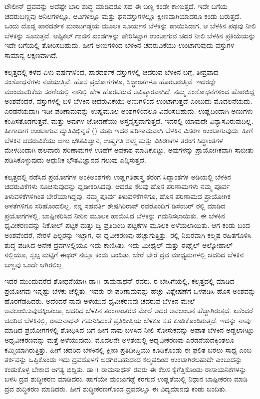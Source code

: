 ಟೌಲೀನ್ ದ್ರವವನ್ನು ಅದೆಷ್ಟೇ ಬಾರಿ ಶುದ್ಧ ಮಾಡಿದರೂ ಸಹ ಈ ಬಣ್ಣ ಕಂಡೇ ಕಾಣುತ್ತದೆ. ಇದೇ ಬಗೆಯ ಚದರುಬಣ್ಣವು ಅನಿಲಗಳಲ್ಲೂ, ಆವಿಗಳಲ್ಲೂ ಮತ್ತು ಘನವಸ್ತುಗಳಲ್ಲೂ ಕ್ಷೀಣವಾಗಿಯಾದರೂ ಕಂಡು ಬರುತ್ತದೆ. ಒಂದು ದೊಡ್ಡ ಪಾರದರ್ಶಕ ಮಂಜುಗಡ್ಡೆಯ ಮೂಲಕ ಸೂರ್ಯನ ಬೆಳಕನ್ನು ಹಾಯಿಸಿದಾಗ, ಆ ಬೆಳಕಿನ ಪಥವು ನೀಲಿ ಬೆಳಕನ್ನು ಸೂಸುತ್ತದೆ. ಆಪ್ಟಿಕಲ್ ಗಾಜಿನ ಖಂಡಗಳನ್ನು ಪೇರಿಸಿಟ್ಟಾಗ ಉಂಟಾಗುವ ಚದರ ನೀಲಿ ಬೆಳಕಿನ ಪ್ರಕಿಯೆಯನ್ನು ಇದೇ ಬಗೆಯಲ್ಲಿ ತೋರಿಸಬಹುದು. ಹೀಗೆ ಅಣುಗಳಿಂದ ಬೆಳಕಿನ ಚದರುವಿಕೆಯು ಉಂಟಾಗುವುದು ವಸ್ತುಗಳ ಸಾಮಾನ್ಯ ಲಕ್ಷಣವಾಗಿದೆ.

ಕಲ್ಕತ್ತದಲ್ಲಿ ಕಳೆದ ಏಳು ವರ್ಷಗಳಿಂದ, ಪಾರದರ್ಶಕ ವಸ್ತುಗಳಲ್ಲಿ ಚದರುವ ಬೆಳಕಿನ ಬಗ್ಗೆ, ತೀವ್ರವಾದ ಸಂಶೋಧನೆಗಳು ನಡೆಯುತ್ತಿವೆ. ಹೊಸ ಪ್ರಯೋಗಗಳೂ, ಸಿದ್ಧಾಂತಗಳೂ ಹೊರ\-ಬರುತ್ತಿವೆ. ಇದರದ್ದೇ ಮುಂದುವರಿಕೆಯ ಸರಣಿಯಲ್ಲಿ ನಾನಿಲ್ಲಿ ಹೇಳ ಹೊರಟಿರುವ ಆವಿಷ್ಕಾರವಾಗಿದೆ. ನಮ್ಮ ಸಂಶೋಧನೆಗಳಿಂದ ಹೊರಬಿದ್ದ ಅಂಶವೆಂದರೆ, ವಸ್ತುಗಳಲ್ಲಿ ಬಿಳಿ ಬೆಳಕಿನ ಚದರುವಿಕೆಯು ಅಣುಗಳಿಂದ ಉಂಟಾಗುತ್ತದೆ ಎಂಬುದು ಮೊದಲನೆಯದು. ಎರಡನೆಯದಾಗಿ ಇಡೀ ಪರಿಣಾಮ\-ವನ್ನು ಉಷ್ಣಮೂಲ ಅಂಶಗಳಿಂದಲೂ ವಿವರಿಸಬಹುದು. ಉಷ್ಣದಿಂದಾಗಿ ಅಣುಗಳು ಕಂಪಿಸ\-ತೊಡಗುತ್ತವೆ, ಮತ್ತು ಅವುಗಳ ಜೋಡಣೆಯು ಅಸ್ತವ್ಯಸ್ತವಾಗುತ್ತದೆ. ಇದರಲ್ಲಿ ಯಾವುದೇ ವಿನ್ಯಾಸವಿರುವುದಿಲ್ಲ. ಹೀಗಾದಾಗ ಉಂಟಾಗುವ ದ್ಯುತಿವಿಭಿನ್ನತೆ () ಮತ್ತು ಇದರ ಪರಿಣಾಮವಾಗಿ ಬೆಳಕಿನ ವಿಸರಣ ಉಂಟಾಗುವುದು. ಹೀಗೆ ಬೆಳಕಿನ ಚದರುವಿಕೆಯು ಅಣು ಭೌತವಿಜ್ಞಾನ, ಉಷ್ಣಗತಿ ಶಾಸ್ತ್ರ ಮತ್ತು ವಿಕಿರಣಗಳ ತರಂಗ ಸಿದ್ಧಾಂತಗಳ ಮೇಳದಿಂದಾಗಿ ಹಲವಾರು ಪರಿಣಾಮಗಳ ಊಹೆಗೆ ಅವಕಾಶ ಮಾಡಿಕೊಟ್ಟು, ಅವುಗಳನ್ನು ಪ್ರಾಯೋಗಿಕವಾಗಿ ಸಾಬೀತು ಪಡಿಸಿಕೊಳ್ಳುವುದು ಆಧುನಿಕ ಭೌತವಿಜ್ಞಾನದ ಗೆಲುವು ಎನ್ನಿಸುತ್ತದೆ.



ಕಲ್ಕತ್ತದಲ್ಲಿ ನಡೆಸಿದ ಪ್ರಯೋಗಗಳ ಅಂಕಿಅಂಶಗಳು ಉಷ್ಣಗತಿಶಾಸ್ತ್ರ ತರಂಗ ಸಿದ್ಧಾಂತಗಳ ಅಡಿಯಲ್ಲಿ ಬೆಳಕಿನ ಚದರುವಿಕೆಗಳು ಸೂಚಿಸುವುದನ್ನು ಧೃಡೀಕರಿಸಿದವು. ಆದರೂ ಕೆಲವು ಹೊಸ ಪರಿಣಾಮಗಳು ನಮ್ಮ ಪೂರ್ವ ತಿಳುವಳಿಕೆಗಳಿಗಿಂತ ಬೇರೆಯಾಗಿದ್ದವು. ನಮ್ಮ ಪೂರ್ವ\break
 ತಿಳುವಳಿಕೆಗಳಿಗೂ, ಹೊಸ ಪರಿಣಾಮದ ಪ್ರಾಯೋಗಿಕ ಅಳತೆಗಳಿಗೂ ಸರಿಹೊಂದಲಿಲ್ಲ. ನನ್ನ ಸಹವರ್ತಿ ಶೇಷಗಿರಿರಾವ್ ರವರೊಂದಿಗೆ ಡಿಸೆಂಬರ್ ರಲ್ಲಿ ಮಾಡಿದ ಪ್ರಯೋಗಗಳಲ್ಲಿ,\break
 ಬಾಷ್ಪೀಕರಿಸಿದ ನೀರಿನ ಮೂಲಕ ಹಾಯಿಸಿದ ಬೆಳಕನ್ನು ಗಮನಿಸಲಾಯಿತು. ಈ ಬೆಳಕಿನ ಧೃವೀಕರಣವನ್ನು ನಿಕೋಲ್ ಪಟ್ಟಕ ಮತ್ತು ದ್ವಿ ಪ್ರತಿಬಿಂಬ ಪಟ್ಟಕಗಳ ಮೂಲಕ ಅಳೆಯಲಾಯಿತು. ಆಗ ಕಂಡು ಬಂದ ಅಂಶವೆಂದರೆ, ನೇರಳೆ ಫಿಲ್ಟರನ್ನು ಇಟ್ಟಾಗ, ಈ ಧೃವೀಕರಣವು ಹೆಚ್ಚಾಗುತ್ತಿತ್ತು. ರಲ್ಲಿ ನಿಖರವಾಗಿ ಕಲ್ಮಷ ರಹಿತಗೊಳಿಸಿ ಶುದ್ಧ ಪಡಿಸಿದ ಅನೇಕ ದ್ರವಗಳಲ್ಲಿಯೂ ಇದು ಕಾಣಿಸಿತು. ಇದು ಮೀಥೈಲ್ ಮತ್ತು ಈಥೈಲ್ ಆಲ್ಕೋಹಾಲ್ ನಲ್ಲಿಯೂ, ಸ್ವಲ್ಪ ಮಟ್ಟಿಗೆ ಈಥರ್ ನಲ್ಲೂ ಕಂಡು ಬಂದಿತು. ಬೇರೆ ಬೇರೆ ದ್ರವ ಮಾಧ್ಯಮಗಳಲ್ಲಿ ಚದರಿದ ಬೆಳಕಿನ ಬಣ್ಣವು ಒಂದೇ ಆಗಿರಲಿಲ್ಲ.

ಇದರ ಮುಂದುವರೆದ ಶೋಧನೆಯಾಗಿ ಡಾ।। ರಾಮನಾಥನ್ ರವರು, ರ ಬೇಸಿಗೆಯಲ್ಲಿ, ಕಲ್ಕತ್ತದಲ್ಲಿ ಮಾಡಿದ ಪ್ರಯೋಗವು ಇನ್ನಷ್ಟು ಬೆಳಕು ಚೆಲ್ಲಿತು. ಇವರು ಈ ಪರಿಣಾಮವನ್ನು ಹೆಚ್ಚು ವಿಶ್ಲೇಷಣೆಗೆ ಒಳಪಡಿಸಿ ಹೊಸ ಅಂಶವನ್ನು ಹೊರಗೆಡಹಿದರು. ಅದೆಂದರೆ ನಾವು ಅಳೆಯುವ ಧೃವೀಕರಣವು ಚದರುವ ಬೆಳಕಿನ ಮೇಲೆ ಅವಲಂಬಿಸುವುದಕ್ಕಿಂತಲೂ, ಚದರಿದ ಬೆಳಕಿನ\break
 ತರಂಗಾಂತರದ ಮೇಲೆ ಅದರ ಅವಲಂಬನೆ ಹೆಚ್ಚಾಗಿರುತ್ತದೆ. ಏಕೆಂದರೆ ಚದರಿದ ಬೆಳಕಿನಲ್ಲಿ, ರಾಮನಾಥನ್ ಗಮನಿಸಿದಂತೆ ಪ್ರತಿದೀಪ್ತಿಯ ಬೆಳಕೂ ಸಹ ಕೂಡಿಕೊಂಡಿರುತ್ತದೆ. ಇದನ್ನು ನಾವು ಮಾಡಿದ ಪ್ರಯೋಗಗಳಲ್ಲಿ ಶೋಧಿಸಿದ ಬಗೆ ಹೀಗೆ \enginline{-} ನಾವು ಬಳಸಿದ ನೀಲಿ ಸೋಸುಕವನ್ನು ಆಪಾತ ಬೆಳಕಿನ ಅಡ್ಡಲಾಗಿಟ್ಟು ಅಧೃವೀಕರಣವನ್ನು ಮತ್ತೆ ಅಳೆಯುವುದು. ಮೊದಲನೇ ಅಳತೆಯಲ್ಲಿ ಅಧೃವೀಕರಣವು ಎರಡನೆಯದಕ್ಕಿಂತಲೂ ಕಮ್ಮಿಯಾಗಿರುತ್ತಿತ್ತು. ಹೀಗೆ ಚದರಿದ ಬೆಳಕಿನಲ್ಲಿ ಕ್ಷೀಣ ಪ್ರತಿದೀಪ್ತಿಯು ಕೂಡಿಕೊಂಡು ಈ ಫಲಿತ ಬರಲು ಸಾಧ್ಯ ಎಂಬ ತರ್ಕವನ್ನು ಒಪ್ಪಿಕೊಂಡು ಇದು ದ್ರವದೊಳಗೆ ಅಡಗಿರಬಹುದಾದ ಕಲ್ಮಷದಿಂದ ಉಂಟಾಗಿರಬಹುದೇ ಎಂಬುದನ್ನು ಕಂಡುಕೊಳ್ಳ ಬೇಕಾದ ಅಗತ್ಯ ಬಿದ್ದಿತು. ಡಾ।। ರಾಮನಾಥನ್ ರವರು ಈ ಕೆಲಸ ಕೈಗೆತ್ತಿಕೊಂಡು ರಾಸಾಯನಿಕಗಳನ್ನು ಬಳಸಿ ದ್ರವ ಶುದ್ಧೀಕರಣ ಮಾಡಿದರು. ಹಾಗೆಯೇ ಮಂಜುಗಡ್ಡೆ ಕರಗುವ ಉಷ್ಣತೆಯಲ್ಲಿ ನಿಧಾನ ಬಾಷ್ಪೀಕರಣ ಮಾಡಿ ದ್ರವ ಶುದ್ಧಿಕರಣ ಮಾಡಿದರು. ಹೀಗೆ ಶುದ್ಧೀಕರಣಗೊಂಡ ದ್ರವದಲ್ಲೂ ಈ ವಿದ್ಯಮಾನವು ಕಂಡು ಬಂದಿತು.

